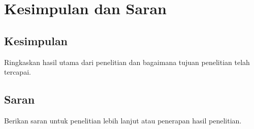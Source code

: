 \chapter{Kesimpulan dan Saran}
\section{Kesimpulan}
Ringkaskan hasil utama dari penelitian dan bagaimana tujuan penelitian telah tercapai.

\section{Saran}
Berikan saran untuk penelitian lebih lanjut atau penerapan hasil penelitian.

